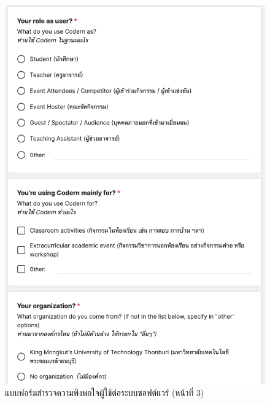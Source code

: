 \documentclass[12pt,one side,openright,a4paper]{cpe-thesis-th}
\begin{document}
\begin{figure}[H]
    \centering
    \includegraphics[width=15cm]{figure/results/forms/survey-google-p2-2.png}
    \caption[แบบฟอร์มสำรวจความพึงพอใจผู้ใช้ต่อระบบซอฟต์แวร์ (หน้าที่ 3)]{แบบฟอร์มสำรวจความพึงพอใจผู้ใช้ต่อระบบซอฟต์แวร์ (หน้าที่ 3)}
\end{figure}
\end{document}
